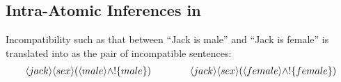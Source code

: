 \subsection{Intra-Atomic Inferences in \ELFULL{}}

Incompatibility such as that between ``Jack is male'' and ``Jack is
female'' is translated into \ELABR{} as the pair of incompatible
sentences:
\begin{eqnarray*}
\langle jack \rangle \langle sex \rangle (\langle male \rangle \land ! \{male\}) 
   \qquad\qquad
\langle jack \rangle \langle sex \rangle (\langle female \rangle \land ! \{female\})
\end{eqnarray*}

